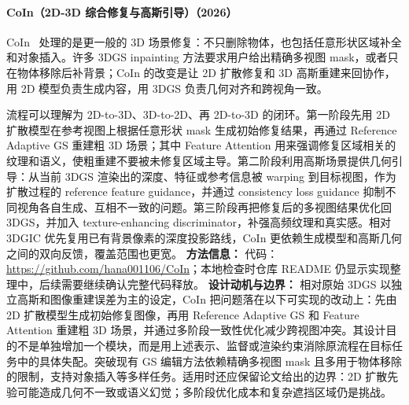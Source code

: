 \paragraph{CoIn（2D-3D 综合修复与高斯引导）（2026）}
CoIn~\cite{2606_27584} 处理的是更一般的 3D 场景修复：不只删除物体，也包括任意形状区域补全和对象插入。许多 3DGS inpainting 方法要求用户给出精确多视图 mask，或者只在物体移除后补背景；CoIn 的改变是让 2D 扩散修复和 3D 高斯重建来回协作，用 2D 模型负责生成内容，用 3DGS 负责几何对齐和跨视角一致。

流程可以理解为 2D-to-3D、3D-to-2D、再 2D-to-3D 的闭环。第一阶段先用 2D 扩散模型在参考视图上根据任意形状 mask 生成初始修复结果，再通过 Reference Adaptive GS 重建粗 3D 场景；其中 Feature Attention 用来强调修复区域相关的纹理和语义，使粗重建不要被未修复区域主导。第二阶段利用高斯场景提供几何引导：从当前 3DGS 渲染出的深度、特征或参考信息被 warping 到目标视图，作为扩散过程的 reference feature guidance，并通过 consistency loss guidance 抑制不同视角各自生成、互相不一致的问题。第三阶段再把修复后的多视图结果优化回 3DGS，并加入 texture-enhancing discriminator，补强高频纹理和真实感。相对 3DGIC 优先复用已有背景像素的深度投影路线，CoIn 更依赖生成模型和高斯几何之间的双向反馈，覆盖范围也更宽。
\textbf{方法信息：} 代码：\url{https://github.com/hana001106/CoIn}；本地检查时仓库 README 仍显示实现整理中，后续需要继续确认完整代码释放。
\textbf{设计动机与边界：} 相对原始 3DGS 以独立高斯和图像重建误差为主的设定，CoIn 把问题落在以下可实现的改动上：先由 2D 扩散模型生成初始修复图像，再用 Reference Adaptive GS 和 Feature Attention 重建粗 3D 场景，并通过多阶段一致性优化减少跨视图冲突。其设计目的不是单独增加一个模块，而是用上述表示、监督或渲染约束消除原流程在目标任务中的具体失配。突破现有 GS 编辑方法依赖精确多视图 mask 且多用于物体移除的限制，支持对象插入等多样任务。适用时还应保留论文给出的边界：2D 扩散先验可能造成几何不一致或语义幻觉；多阶段优化成本和复杂遮挡区域仍是挑战。

